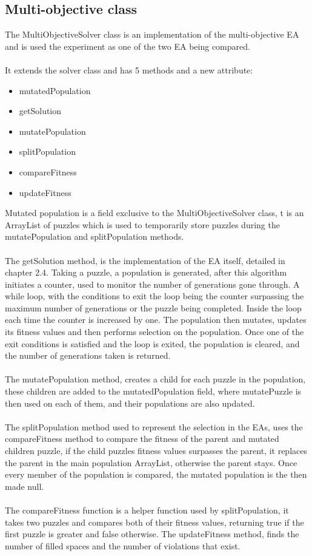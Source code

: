 \documentclass[a4paper,11pt]{article}
\begin{document}
\subsection{Multi-objective class}
The MultiObjectiveSolver class is an implementation of the multi-objective EA and  is used the experiment as one of the two EA being compared.\\\\ It extends the solver class and has 5 methods and a new attribute:
\begin{itemize}
	\item mutatedPopulation
	\item getSolution
	\item mutatePopulation
	\item splitPopulation
	\item compareFitness
	\item updateFitness
\end{itemize}

Mutated population is a field exclusive to the MultiObjectiveSolver class, t is an ArrayList of puzzles which is used to temporarily store puzzles during the mutatePopulation and splitPopulation methods.\\\\ The getSolution method, is the implementation of the EA itself, detailed in chapter 2.4. Taking a puzzle, a population is generated, after this algorithm initiates a counter, used to monitor the number of generations gone through. A while loop, with the conditions to exit the loop being the counter surpassing the maximum number of generations or the puzzle being completed. Inside the loop each time the counter is increased by one. The population then mutates, updates its fitness values and then performs selection on the population. Once one of the exit conditions is satisfied and the loop is exited, the population is cleared, and the number of generations taken is returned. \\\\ The mutatePopulation method, creates a child for each puzzle in the population, these children are added to the mutatedPopulation field, where mutatePuzzle is then used on each of them, and their populations are also updated.\\\\ The splitPopulation method used to represent the selection in the EAs, uses the compareFitness method to compare the fitness of the parent and mutated children puzzle, if the child puzzles fitness values surpasses the parent, it replaces the parent in the main population ArrayList, otherwise the parent stays. Once every member of the population is compared, the mutated population is the then made null.\\\\ The compareFitness function is a helper function used by splitPopulation, it takes two puzzles and compares both of their fitness values, returning true if the first puzzle is greater and false otherwise. The updateFitness method, finds the number of filled spaces and the number of violations that exist.  
\end{document}
